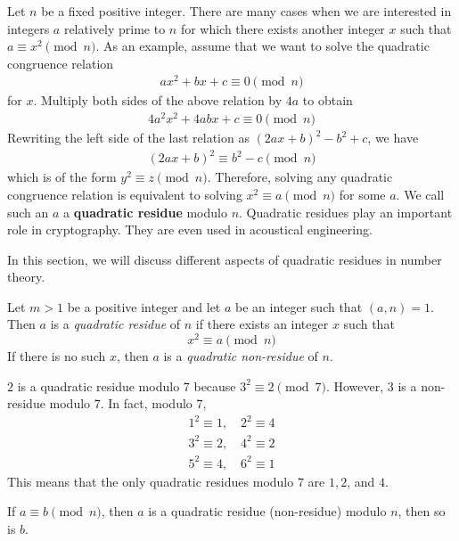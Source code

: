 Let $n$ be a fixed positive integer. There are many cases when we are interested in integers $a$ relatively prime to $n$ for which there exists another integer $x$ such that $a \equiv x^2 \pmod n$. As an example, assume that we want to solve the quadratic congruence relation
\begin{align*}
	ax^2 + bx + c \equiv 0 \pmod n
\end{align*}
for $x$. Multiply both sides of the above relation by $4a$ to obtain
\begin{align*}
	4a^2x^2+4abx+c \equiv 0 \pmod n
\end{align*}
Rewriting the left side of the last relation as $(2ax+b)^2 -b^2+c$, we have
\begin{align*}
	(2ax+b)^2 \equiv b^2-c \pmod n
\end{align*}
which is of the form $y^2 \equiv z \pmod n$. Therefore, solving any quadratic congruence relation is equivalent to solving $x^2 \equiv a \pmod n$ for some $a$. We call such an $a$ a \textbf{quadratic residue} modulo $n$. Quadratic residues play an important role in cryptography. They are even used in acoustical engineering.

In this section, we will discuss different aspects of quadratic residues in number theory.

\begin{definition}
	Let $m>1$ be a positive integer and let $a$ be an integer such that $(a,n)=1$. Then $a$ is a \textit{quadratic residue} of $n$ if there exists an integer $x$ such that
	\[x^2\equiv a\pmod n\]
	If there is no such $x$, then $a$ is a \textit{quadratic non-residue} of $n$.
\end{definition}

\begin{example}
	$2$ is a quadratic residue modulo $7$ because $3^2 \equiv 2 \pmod 7$. However, $3$ is a non-residue modulo $7$. In fact, modulo $7$,
	\begin{align*}
		1^2 \equiv 1, \quad 2^2 \equiv 4\\
		3^2 \equiv 2, \quad 4^2 \equiv 2\\
		5^2 \equiv 4, \quad 6^2 \equiv 1
	\end{align*}
	This means that the only quadratic residues modulo $7$ are $1, 2$, and $4$.
\end{example}

\begin{corollary}\label{cor:qrequiv}
	If $a \equiv b \pmod n$, then $a$ is a quadratic residue (non-residue) modulo $n$, then so is $b$.
\end{corollary}

